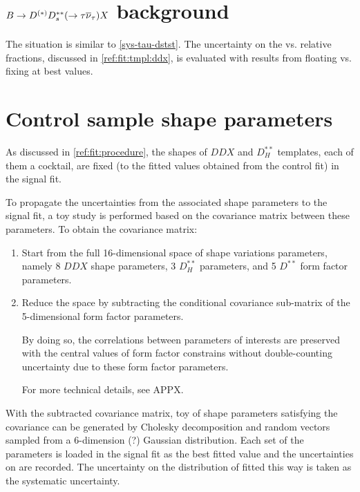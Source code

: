 \section{$B \rightarrow D^{(*)} D^{**}_s (\rightarrow \tau{\ensuremath{{\overline{\nu}}_\tau}}) X$ background}
\label{sys-tau-ddx}

The situation is similar to \cref{sys-tau-dstst}.
The uncertainty on the \tauon vs. \muon relative fractions,
discussed in \cref{ref:fit:tmpl:ddx},
is evaluated with results from floating vs. fixing at best values.


\section{Control sample shape parameters}
\label{sys-model-ctrl}

As discussed in \cref{ref:fit:procedure},
the shapes of $DDX$ and $D^{**}_H$ templates,
each of them a cocktail,
are fixed (to the fitted values obtained from the control fit) in the signal
fit.

To propagate the uncertainties from the associated shape parameters to
the signal fit,
a toy study is performed based on the covariance matrix between these
parameters.
To obtain the covariance matrix:

\begin{enumerate}
    \item Start from the full 16-dimensional space of shape variations
        parameters,
        namely 8 $DDX$ shape parameters,
        3 $D^{**}_H$ parameters,
        and 5 $D^{**}$ form factor parameters.
    \item Reduce the space by subtracting the conditional covariance
        sub-matrix of the 5-dimensional form factor parameters.

        By doing so, the correlations between parameters of interests are
        preserved with the central values of form factor constrains
        without double-counting uncertainty due to these form factor parameters.

        For more technical details, see APPX.
\end{enumerate}

With the subtracted covariance matrix, toy of shape parameters satisfying
the covariance can be generated by Cholesky decomposition and random vectors
sampled from a 6-dimension (?) Gaussian distribution.
Each set of the parameters is loaded in the signal fit as the best
fitted value and the uncertainties on \RDX are recorded.
The uncertainty on the distribution of \RDX fitted this way is taken as the
systematic uncertainty.


